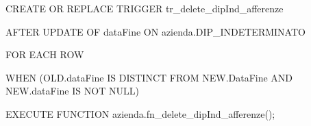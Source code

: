         \ttfamily
            \begin{flushleft}
                \begin{description}
                    \item CREATE OR REPLACE TRIGGER tr\_delete\_dipInd\_afferenze
                    \item AFTER UPDATE OF dataFine ON azienda.DIP\_INDETERMINATO
                    \item FOR EACH ROW
                    \item WHEN (OLD.dataFine IS DISTINCT FROM NEW.DataFine AND NEW.dataFine IS NOT NULL)
                    \item EXECUTE FUNCTION azienda.fn\_delete\_dipInd\_afferenze();
                \end{description}
            \end{flushleft}
        \normalfont

\newpage

